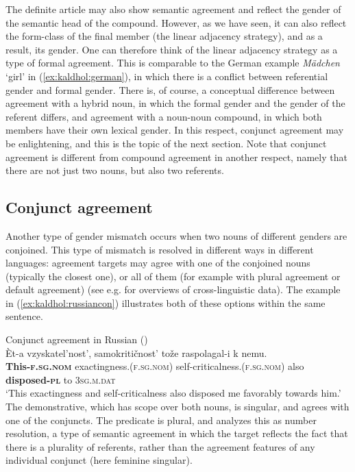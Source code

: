 \documentclass[output=paper]{langscibook}
\begin{document}
The definite article may also show semantic agreement and reflect the gender of the semantic head of the compound. However, as we have seen, it can also reflect the form-class of the final member (the linear adjacency strategy), and as a result, its gender. One can therefore think of the linear adjacency strategy as a type of formal agreement. This is comparable to the German example \textit{Mädchen} `girl' in (\ref{ex:kaldhol:german}), in which there is a conflict between referential gender and formal gender. There is, of course, a conceptual difference between agreement with a hybrid noun, in which the formal gender and the gender of the referent differs, and agreement with a noun-noun compound, in which both members have their own lexical gender. In this respect, conjunct agreement may be enlightening, and this is the topic of the next section. Note that conjunct agreement is different from compound agreement in another respect, namely that there are not just two nouns, but also two referents.

\subsection{Conjunct agreement}\label{sec:kaldhol:conjunct}
Another type of gender mismatch occurs when two nouns of different genders are conjoined. This type of mismatch is resolved in different ways in different languages: agreement targets may agree with one of the conjoined nouns (typically the closest one), or all of them (for example with plural agreement or default agreement) (see e.g.\@ \citealt{Corbett1991,Corbett2006} for overviews of cross-linguistic data). The example in (\ref{ex:kaldhol:russiancon}) illustrates both of these options within the same sentence.

\ea\label{ex:kaldhol:russiancon}
	Conjunct agreement in Russian (\citealt[220]{Corbett2006}) \\
	\gll Èt-a vzyskatel'nost', samokritičnost' tože raspolagal-i k nemu.\\
	\textbf{This-\textsc{f.sg.nom}} exactingness\textsc{.(f.sg.nom)} self-criticalness\textsc{.(f.sg.nom)} also \textbf{disposed-\textsc{pl}} to \textsc{3sg.m.dat}\\
	\glt `This exactingness and self-criticalness also disposed me favorably towards him.'
\z
The demonstrative, which has scope over both nouns, is singular, and agrees with one of the conjuncts. The predicate is plural, and \textcite[220]{Corbett2006} analyzes this as number resolution, a type of semantic agreement in which the target reflects the fact that there is a plurality of referents, rather than the agreement features of any individual conjunct (here feminine singular).
\end{document}
